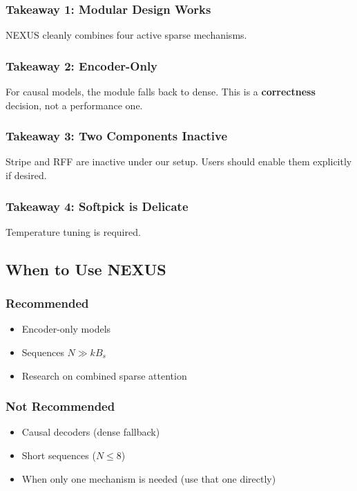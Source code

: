 \subsubsection{Takeaway 1: Modular Design Works}

NEXUS cleanly combines four active sparse mechanisms.

\subsubsection{Takeaway 2: Encoder-Only}

For causal models, the module falls back to dense. This is a \textbf{correctness} 
decision, not a performance one.

\subsubsection{Takeaway 3: Two Components Inactive}

Stripe and RFF are inactive under our setup. Users should enable them 
explicitly if desired.

\subsubsection{Takeaway 4: Softpick is Delicate}

Temperature tuning is required.

\subsection{When to Use NEXUS}

\subsubsection{Recommended}
\begin{itemize}
\item Encoder-only models
\item Sequences $N \gg k B_s$
\item Research on combined sparse attention

\end{itemize}
\subsubsection{Not Recommended}
\begin{itemize}
\item Causal decoders (dense fallback)
\item Short sequences ($N \leq 8$)
\item When only one mechanism is needed (use that one directly)

\end{itemize}
